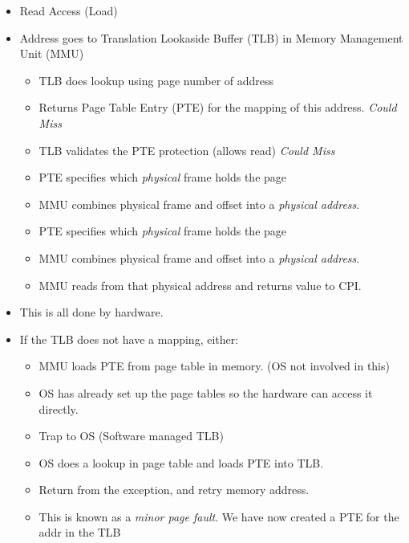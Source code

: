 \begin{itemize}
\item
  Read Access (Load)
\item
  Address goes to Translation Lookaside Buffer (TLB) in Memory
  Management Unit (MMU)

  \begin{itemize}
  \item
    TLB does lookup using page number of address
  \item
    Returns Page Table Entry (PTE) for the mapping of this address.
    \emph{Could Miss}
  \item
    TLB validates the PTE protection (allows read) \emph{Could Miss}
  \item
    PTE specifies which \emph{physical} frame holds the page
  \item
    MMU combines physical frame and offset into a \emph{physical
    address}.
  \item
    PTE specifies which \emph{physical} frame holds the page
  \item
    MMU combines physical frame and offset into a \emph{physical
    address}.
  \item
    MMU reads from that physical address and returns value to CPI.
  \end{itemize}
\item
  This is all done by hardware.
\item
  If the TLB does not have a mapping, either:

  \begin{itemize}
  \item
    MMU loads PTE from page table in memory. (OS not involved in this)
  \item
    OS has already set up the page tables so the hardware can access it
    directly.
  \item
    Trap to OS (Software managed TLB)
  \item
    OS does a lookup in page table and loads PTE into TLB.
  \item
    Return from the exception, and retry memory address.
  \item
    This is known as a \emph{minor page fault}. We have now created a
    PTE for the addr in the TLB
  \end{itemize}
\end{itemize}

